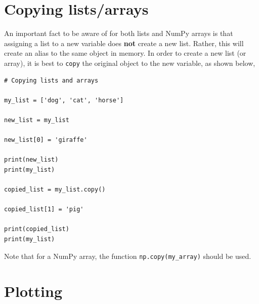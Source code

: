 \documentclass[a4paper]{article}
\begin{document}
\section{Copying lists/arrays}

An important fact to be aware of for both lists and NumPy arrays is that assigning a list to a new variable does \textbf{not} create a new list.
Rather, this will create an alias to the same object in memory.
In order to create a new list (or array), it is best to \texttt{copy} the original object to the new variable, as shown below,
\begin{lstlisting}
# Copying lists and arrays

my_list = ['dog', 'cat', 'horse']

new_list = my_list

new_list[0] = 'giraffe'

print(new_list)
print(my_list)

copied_list = my_list.copy()

copied_list[1] = 'pig'

print(copied_list)
print(my_list)
\end{lstlisting}
Note that for a NumPy array, the function \texttt{np.copy(my\_array)} should be used.

\section{Plotting}
\end{document}
